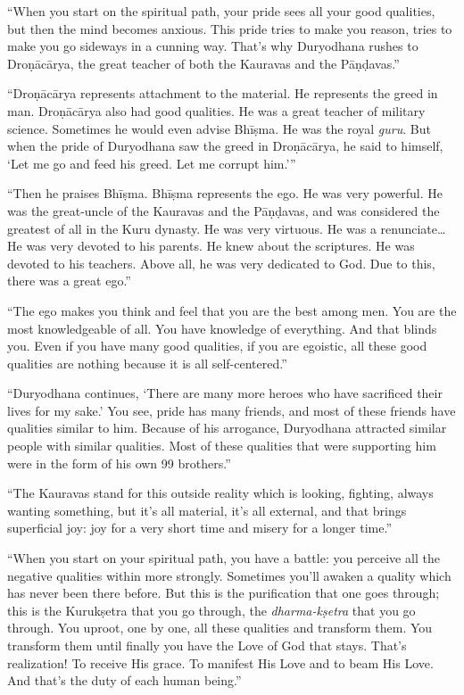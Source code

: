 \enquote{When you start on the spiritual path, your pride sees all your good qualities, but then the mind becomes anxious. This pride tries to make you reason, tries to make you go sideways in a cunning way. That’s why Duryodhana rushes to Droṇācārya, the great teacher of both the Kauravas and the Pāṇḍavas.}

\enquote{Droṇācārya represents attachment to the material. He represents the greed in man. Droṇācārya also had good qualities. He was a great teacher of military science. Sometimes he would even advise Bhīṣma. He was the royal \textit{guru}. But when the pride of Duryodhana saw the greed in Droṇācārya, he said to himself, \enquote{Let me go and feed his greed. Let me corrupt him.}}

\enquote{Then he praises Bhīṣma. Bhīṣma represents the ego. He was very powerful. He was the great-uncle of the Kauravas and the Pāṇḍavas, and was considered the greatest of all in the Kuru dynasty. He was very virtuous. He was a renunciate\ldots He was very devoted to his parents. He knew about the scriptures. He was devoted to his teachers. Above all, he was very dedicated to God. Due to this, there was a great ego.}

\enquote{The ego makes you think and feel that you are the best among men. You are the most knowledgeable of all. You have knowledge of everything. And that blinds you. Even if you have many good qualities, if you are egoistic, all these good qualities are nothing because it is all self-centered.}

\enquote{Duryodhana continues, \enquote{There are many more heroes who have sacrificed their lives for my sake.} You see, pride has many friends, and most of these friends have qualities similar to him. Because of his arrogance, Duryodhana attracted similar people with similar qualities. Most of these qualities that were supporting him were in the form of his own 99 brothers.}

\enquote{The Kauravas stand for this outside reality which is looking, fighting, always wanting something, but it’s all material, it’s all external, and that brings superficial joy: joy for a very short time and misery for a longer time.}

\enquote{When you start on your spiritual path, you have a battle: you perceive all the negative qualities within more strongly. Sometimes you’ll awaken a quality which has never been there before. But this is the purification that one goes through; this is the Kurukṣetra that you go through, the \textit{dharma-kṣetra} that you go through. You uproot, one by one, all these qualities and transform them. You transform them until finally you have the Love of God that stays. That’s realization! To receive His grace. To manifest His Love and to beam His Love. And that's the duty of each human being.}

